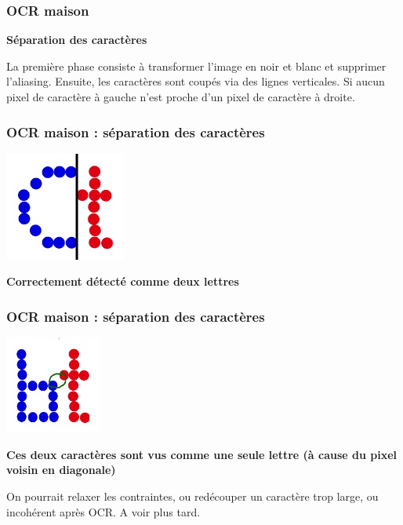 \documentclass[xcolor=dvipsnames]{beamer}
\begin{document}
\begin{frame}
\frametitle{OCR maison}
    \begin{center}\begin{alertblock}{}
            \begin{center}
            \textbf{\Large Séparation des caractères}
            \end{center}

La première phase consiste à transformer l'image en noir et blanc et supprimer l'aliasing. Ensuite, les caractères sont coupés via des lignes verticales. Si aucun pixel de caractère à gauche n'est proche d'un pixel de caractère à droite.

    \end{alertblock}\end{center}
\end{frame}

\begin{frame}
\frametitle{OCR maison : séparation des caractères}
       \includegraphics[width=150px]{10x9_Ct_split.png}
      \begin{alertblock}{}
            \begin{center}
                  \textbf{\Large Correctement détecté comme deux lettres}
            \end{center}
      \end{alertblock}
\end{frame}

\begin{frame}
\frametitle{OCR maison : séparation des caractères }
       \includegraphics[width=120px]{9x9_bt_conflit.png}
      \begin{alertblock}{}
            \begin{center}
                  \textbf{\Large Ces deux caractères sont vus comme une seule lettre (à cause du pixel voisin en diagonale)}
            \end{center}
      \end{alertblock}
\pause
On pourrait relaxer les contraintes, ou redécouper un caractère trop large, ou incohérent après OCR\pause.
A voir plus tard.

\end{frame}
\end{document}
